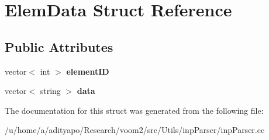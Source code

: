 \hypertarget{struct_elem_data}{
\section{ElemData Struct Reference}
\label{struct_elem_data}
}
\subsection*{Public Attributes}
\begin{DoxyCompactItemize}
\item 
\hypertarget{struct_elem_data_ae78d3b406ae14e787d8619fb534d4f84}{
vector$<$ int $>$ {\bfseries elementID}}
\label{struct_elem_data_ae78d3b406ae14e787d8619fb534d4f84}

\item 
\hypertarget{struct_elem_data_ae3ce70b8de33840dd0f1346bc8b5e19d}{
vector$<$ string $>$ {\bfseries data}}
\label{struct_elem_data_ae3ce70b8de33840dd0f1346bc8b5e19d}

\end{DoxyCompactItemize}


The documentation for this struct was generated from the following file:\begin{DoxyCompactItemize}
\item 
/u/home/a/adityapo/Research/voom2/src/Utils/inpParser/inpParser.cc\end{DoxyCompactItemize}
